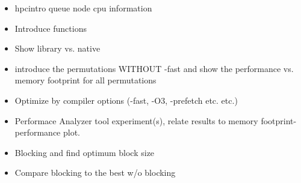 \begin{itemize}
\item hpcintro queue node cpu information
\item Introduce functions
\item Show library vs. native
\item introduce the permutations WITHOUT -fast and show the performance vs. memory footprint for all permutations
\item Optimize by compiler options (-fast, -O3, -prefetch etc. etc.)
\item Performace Analyzer tool experiment(s), relate results to  memory footprint-performance plot.
\item Blocking and find optimum block size
\item Compare blocking to the best w/o blocking
\end{itemize}
